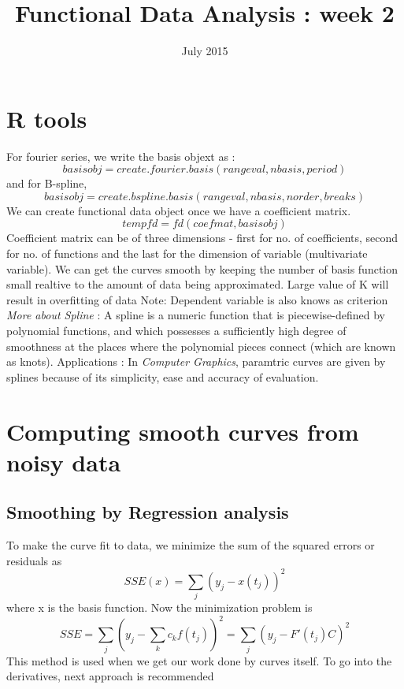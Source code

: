 \documentclass{article}
\title{Functional Data Analysis : week 2}
\date{July 2015}
\begin{document}
\maketitle

\section{R tools}
For fourier series, we write the basis objext as :
\[ basisobj = create.fourier.basis(rangeval, nbasis,period)\]
and for B-spline,
\[  basisobj = create.bspline.basis(rangeval, nbasis,norder, breaks) \]
We can create functional data object once we have a coefficient matrix. 
\[ tempfd = fd(coefmat, basisobj)\]
Coefficient matrix can be of three dimensions - first for no. of coefficients, second for no. of functions and the last for the dimension of variable (multivariate variable).   \newline
We can get the curves smooth by keeping the number of basis function small realtive to the amount of data being approximated. Large value of K will result in overfitting of data\newline
Note: Dependent variable is also knows as criterion\newline
\textit{ More about Spline }: A spline is a numeric function that is piecewise-defined by polynomial functions, and which possesses a sufficiently high degree of smoothness at the places where the polynomial pieces connect (which are known as knots). Applications : In \textit{Computer Graphics}, paramtric curves are given by splines because of its simplicity, ease and accuracy of evaluation. 
\section{Computing smooth curves from noisy data}
\subsection{Smoothing by Regression analysis}
To make the curve fit to data, we minimize the sum of the squared errors or residuals as \[ SSE(x) = \sum_j (y_j - x(t_j))^2 \] where x is the basis function. Now the minimization problem is \[SSE = \sum_j (y_j-\sum_{k} c_k f(t_j))^2  = \sum_j(y_j - F'(t_j)C)^2\]
This method is used when we get our work done by curves itself. To go into the derivatives, next approach is recommended
\end{document}
